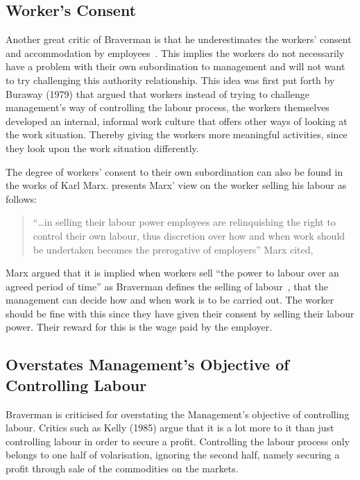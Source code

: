 \documentclass[a4paper,12pt,titlepage]{article}
\begin{document}
  \subsection{Worker's Consent}
  Another great critic of Braverman is that he underestimates the workers'
  consent and accommodation by employees~\cite[155]{mnpb}. This implies the
  workers do not necessarily have a problem with their own subordination to
  management and will not want to try challenging this authority
  relationship. This idea was first put forth by Buraway (1979) that argued
  that workers instead of trying to challenge management's way of controlling
  the labour process, the workers themselves developed an internal, informal
  work culture that offers other ways of looking at the work situation.
  Thereby giving the workers more meaningful activities, since they look
  upon the work situation differently.

  The degree of workers' consent to their own subordination can also be
  found in the works of Karl Marx. \cite{mnpb} presents Marx' view on
  the worker selling his labour as follows:
  \begin{quote}
    ``\ldots in selling their labour power employees are relinquishing the
    right to control their own labour, thus discretion over how
    and when work should be undertaken becomes the
    prerogative of employers'' Marx cited,~\cite[229]{mnpb}
  \end{quote}
  Marx argued that it is implied when workers sell  
  ``the power to labour over an agreed period of time'' as
  Braverman defines the selling of labour~\cite[54]{hb},
  that the management can decide how and when work is to
  be carried out. The worker should be fine with this since
  they have given their consent by selling their labour power.
  Their reward for this is the wage paid by the employer.

  \subsection{Overstates Management's Objective of Controlling Labour}
  Braverman is criticised for overstating the Management's objective
  of controlling labour. Critics such as Kelly (1985) argue that it
  is a lot more to it than just controlling labour in order to
  secure a profit. Controlling the labour process only belongs to
  one half of volarisation, ignoring the second half, namely
  securing a profit through sale of the commodities on the markets.
\end{document}
